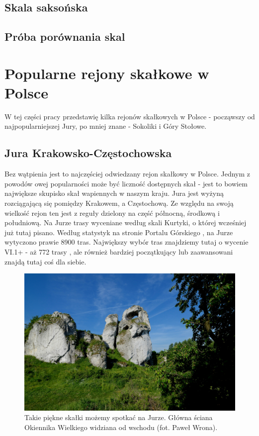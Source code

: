\documentclass{article}
\begin{document}
\subsection{Skala saksońska}

\subsection{Próba porównania skal}


\section{Popularne rejony skałkowe w Polsce}
\lettrine[lines=2]{W}{} tej części pracy przedstawię kilka rejonów skałkowych w Polsce - począwszy od najpopularniejszej Jury, po mniej znane - Sokoliki i Góry Stołowe.

\subsection{Jura Krakowsko-Częstochowska}
Bez wątpienia jest to najczęściej odwiedzany rejon skałkowy w Polsce. Jednym z powodów owej popularności może być liczność dostępnych skał - jest to bowiem największe skupisko skał wapiennych w naszym kraju. Jura jest wyżyną rozciągającą się pomiędzy Krakowem, a Częstochową. Ze względu na swoją wielkość rejon ten jest z reguły dzielony na część północną, środkową i południową. Na Jurze trasy wyceniane według skali Kurtyki, o której wcześniej już tutaj pisano. Według statystyk na stronie Portalu Górskiego \cite{topo-jura}, na Jurze wytyczono prawie 8900 tras. Największy wybór tras znajdziemy tutaj o wycenie VI.1+ - aż 772 trasy \cite{topo-jura}, ale również bardziej początkujący lub zaawansowani znajdą tutaj coś dla siebie.

\begin{figure}[!htbp]
	\begin{center}
		\includegraphics[width=0.9\linewidth]{images/jura-okiennik.eps}
	\end{center}
	\caption{Takie piękne skałki możemy spotkać na Jurze. Główna ściana Okiennika Wielkiego widziana od wschodu (fot. Paweł Wrona)\cite{jura-okiennik}.}
	\label{}
\end{figure}
\end{document}
